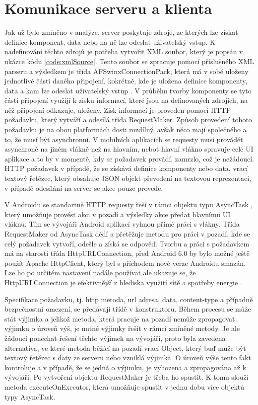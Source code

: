 \section{Komunikace serveru a klienta}
Jak už bylo zmíněno v analýze, server poskytuje zdroje, ze kterých lze získat definice komponent, data nebo na ně lze odeslat uživatelský vstup. K nadefinování těchto zdrojů je potřeba vytvořit XML soubor, který je popsán v ukázce kódu \ref{code:xmlSource}. Tento soubor se zpracuje pomocí příslušného XML parseru a výsledkem je třída AFSwinxConnectionPack, která má v sobě uloženy jednotlivé části daného připojení, kokrétně, kde je uložena definice komponenty, data a kam lze odeslat uživatelský vstup \cite{tomasek-thesis}. V průběhu tvorby komponenty se tyto části připojení využijí k zisku informací, které jsou na definovaných zdrojích, na něž připojení odkazuje, uloženy. Zisk informací je proveden pomocí HTTP požadavku, který vytváří a odesílá třída RequestMaker. Způsob provedení tohoto požadavku je na obou platformách dosti rozdílný, avšak něco mají společného a to, že musí být asynchronní. V mobilních aplikacích se requesty musí provádět asynchroně na jiném vlákně než na hlavním, neboť hlavní vlákno spravuje celé UI aplikace a to by v momentě, kdy se požadavek provádí, zamrzlo, což je nežádoucí. HTTP požadavek v případě, že se získává definice komponenty nebo data, vrací textový řetězec, který obsahuje JSON objekt převedení na textovou reprezentaci, v případě odesílání na server se akce pouze provede.

V Androidu se standartně HTTP requesty řeší v rámci objektu typu AsyncTask \cite{asynctask}, který umožňuje provést akci v pozadí a výsledky akce předat hlavnímu UI vláknu. Tím se vývojáři Android aplikací vyhnou přímé práci s vlákny. Třída RequestMaker od AsyncTask dědí a přetěžuje metodu pro práci v pozadí, kde se celý požadavek vytvoří, odešle a získá se odpověď. Tvorbu a práci s požadavkem má na starosti třída HttpURLConnection, před Android 6.0 by bylo možné ještě použít Apache HttpClient, který byl s příchodem nové verze Androidu smazán. Lze ho po určitém nastavení nadále používat ale ukazuje se, že HttpURLConnection je efektivnější z hlediska využití sítě a spotřeby energie \cite{httpclientremoval}. 

Specifikace požadavku, tj. http metoda, url adresa, data, content-type a případně bezpečnostní omezení, se předávají třídě v konstruktoru. Během procesu se může stát výjimka a jelikož metoda, která pracuje na pozadí nemůže zpropagovat výjimku o úroveň výš, je nutné výjimky řešit v rámci zmíněné metody. Je ale žádoucí ponechat řešení těchto výjimek na vývojáři, proto byla zavedena alternativa, ve které metoda běžící na pozadí vrací Object, který buď může být textový řetězec s daty ze serveru nebo vzniklá výjimka. O úroveň výše tento fakt kontroluje a v případě, že se jedná o výjimku, je vyhozena a zpropagována až k vývojáři. 
Po vytvoření objektu RequestMaker je třeba ho spustit. K tomu slouží metoda executeOnExecutor, která umožňuje spustit v jednu dobu více objektů typy AsyncTask.

